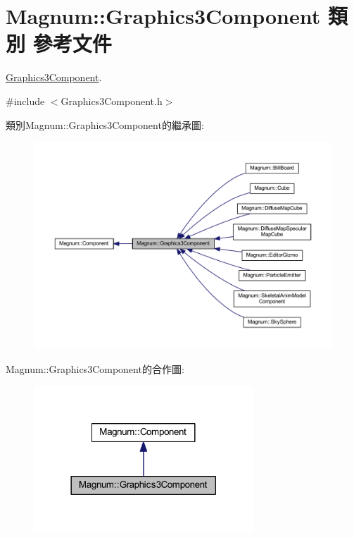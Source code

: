 \hypertarget{class_magnum_1_1_graphics3_component}{}\section{Magnum\+:\+:Graphics3\+Component 類別 參考文件}
\label{class_magnum_1_1_graphics3_component}


\hyperlink{class_magnum_1_1_graphics3_component}{Graphics3\+Component}.  




{\ttfamily \#include $<$Graphics3\+Component.\+h$>$}



類別\+Magnum\+:\+:Graphics3\+Component的繼承圖\+:\nopagebreak
\begin{figure}[H]
\begin{center}
\leavevmode
\includegraphics[width=350pt]{class_magnum_1_1_graphics3_component__inherit__graph}
\end{center}
\end{figure}


Magnum\+:\+:Graphics3\+Component的合作圖\+:\nopagebreak
\begin{figure}[H]
\begin{center}
\leavevmode
\includegraphics[width=234pt]{class_magnum_1_1_graphics3_component__coll__graph}
\end{center}
\end{figure}
